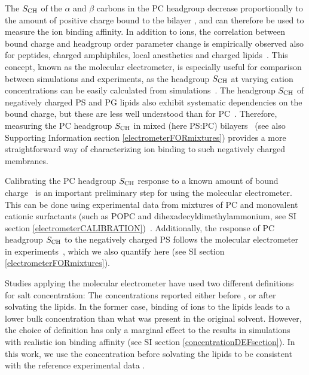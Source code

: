 \documentclass[journal=jpcbfk,manuscript=article]{achemso}
\begin{document}
The $S_{\rm CH}$ of the $\alpha$ and $\beta$ carbons in the PC headgroup
decrease proportionally to the amount of positive
charge bound to the bilayer \cite{akutsu81,altenbach84,seelig87},
and can therefore be used to measure the ion binding affinity.
In addition to ions, the correlation between bound charge and headgroup order parameter change
is empirically observed also for peptides, charged amphiphiles, local anesthetics and charged lipids~\cite{scherer87,beschiaschvili91}.
This concept, known as the molecular electrometer, is especially useful for 
comparison between simulations and experiments, as
the headgroup $S_{\rm CH}$ at varying cation
concentrations can be easily calculated from
simulations~\cite{catte16}. The headgroup $S_{\rm CH}$
of negatively charged PS and PG lipids also exhibit systematic dependencies on the bound charge, but these are less well understood than for PC~\cite{borle85,macdonald87,roux86,roux90}.
Therefore, measuring the PC headgroup $S_{\rm CH}$ in 
mixed (here PS:PC) bilayers~\cite{roux86,roux90,roux91} (see also Supporting Information section \ref{electrometerFORmixtures}) provides a more straightforward way of characterizing ion binding to such negatively charged membranes.

Calibrating the PC headgroup $S_{\rm CH}$ response to a known amount of bound charge~\cite{catte16,melcr18} is an important preliminary step for using the molecular electrometer.
This can be done using experimental data from mixtures of PC and
monovalent cationic surfactants (such as POPC and dihexadecyldimethylammonium,
see SI section \ref{electrometerCALIBRATION})~\cite{scherer89,melcr18}.
Additionally, the response of PC headgroup $S_{\rm CH}$ to the negatively
charged PS follows the molecular electrometer in experiments~\cite{scherer87},
which we also quantify here (see SI section \ref{electrometerFORmixtures}).

Studies applying the molecular electrometer have used two different definitions for salt concentration:
The concentrations reported either before \cite{akutsu81,roux90,catte16}, or after \cite{altenbach84,melcr18} solvating the lipids.
In the former case, binding of ions to the lipids leads to a lower bulk concentration than what was present in the original solvent.
However, the choice of definition has only a marginal effect
to the results in simulations with realistic ion binding affinity
(see SI section \ref{concentrationDEFsection}).
In this work, we use the concentration before solvating the lipids to be consistent with the reference
experimental data \cite{roux90}.
\end{document}
